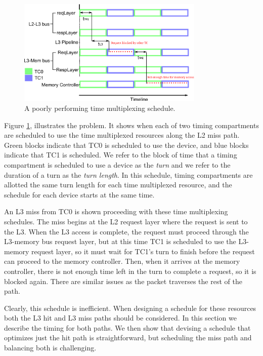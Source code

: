 \begin{figure}
    \begin{center}
        \includegraphics[width=3.5in]{figs/problem.pdf}
        \caption{A poorly performing time multiplexing schedule.}
        \label{fig:problem}
    \end{center}
\end{figure}

Figure \ref{fig:problem}, illustrates the problem. It shows when each of two 
timing compartments are scheduled to use the time multiplexed resources along 
the L2 miss path. Green blocks indicate that TC0 is scheduled to use the device, 
and blue blocks indicate that TC1 is scheduled. We refer to the block of time 
that a timing compartment is scheduled to use a device as the \emph{turn} and 
we refer to the duration of a turn as the \emph{turn length}. In this schedule, 
timing compartments are allotted the same turn length for each time multiplexed 
resource, and the schedule for each device starts at the same time.

An L3 miss from TC0 is shown proceeding with these time multiplexing schedules.
The miss begins at the L2 request layer where the request is sent to the L3.  
When the L3 access is complete, the request must proceed through the L3-memory 
bus request layer, but at this time TC1 is scheduled to use the L3-memory 
request layer, so it must wait for TC1's turn to finish before the request can 
proceed to the memory controller. Then, when it arrives at the memory 
controller, there is not enough time left in the turn to complete a request, so 
it is blocked again. There are similar issues as the packet traverses the rest
of the path.

Clearly, this schedule is inefficient. When designing a schedule for these 
resources both the L3 hit and L3 miss paths should be considered. In this 
section we describe the timing for both paths. We then show that devising a 
schedule that optimizes just the hit path is straightforward, but scheduling 
the miss path and balancing both is challenging.

